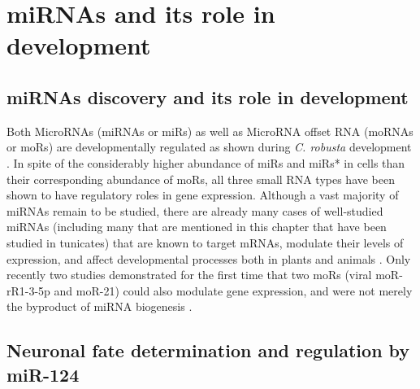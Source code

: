 \documentclass[graybox]{svmult}
\begin{document}
\section{miRNAs and its role in development}
\label{sec:3}

\subsection{miRNAs discovery and its role in development}

Both MicroRNAs (miRNAs or miRs) as well as MicroRNA offset RNA (moRNAs or moRs) 
are developmentally regulated as shown during \textit{C. robusta} development 
\cite{Shi2009}. In spite of the considerably higher abundance of miRs and 
miRs* in cells than their corresponding abundance of moRs, all three small RNA 
types have been shown to have regulatory roles in gene expression. Although a 
vast majority of miRNAs remain to be studied, there are already many cases of 
well-studied miRNAs (including many that are mentioned in this chapter that 
have been studied in tunicates) that are known to target mRNAs, modulate their 
levels of expression, and affect developmental processes both in plants and 
animals \cite{Zhao2018}. Only recently two studies demonstrated for 
the first time that two moRs (viral moR-rR1-3-5p and moR-21) could also 
modulate gene expression, and were not merely the byproduct of miRNA biogenesis 
\cite{UMBACH2010592, Zhao2016}.

\subsection{Neuronal fate determination and regulation by miR-124}
\end{document}
